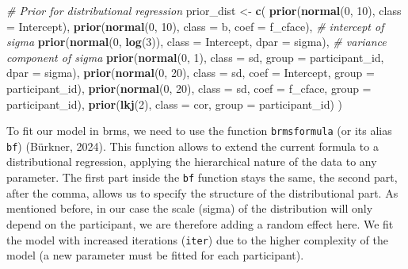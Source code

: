 \documentclass[
  doc,12pt,floatsintext]{apa7}
\newenvironment{Shaded}{\begin{snugshade}}{\end{snugshade}}
\newcommand{\AttributeTok}[1]{\textcolor[rgb]{0.13,0.29,0.53}{#1}}
\newcommand{\CommentTok}[1]{\textcolor[rgb]{0.56,0.35,0.01}{\textit{#1}}}
\newcommand{\DecValTok}[1]{\textcolor[rgb]{0.00,0.00,0.81}{#1}}
\newcommand{\FunctionTok}[1]{\textcolor[rgb]{0.13,0.29,0.53}{\textbf{#1}}}
\newcommand{\NormalTok}[1]{#1}
\newcommand{\OtherTok}[1]{\textcolor[rgb]{0.56,0.35,0.01}{#1}}
\begin{document}
\begin{Shaded}
\begin{Highlighting}[]
\CommentTok{\# Prior for distributional regression}
\NormalTok{prior\_dist }\OtherTok{\textless{}{-}} \FunctionTok{c}\NormalTok{(}
  \FunctionTok{prior}\NormalTok{(}\FunctionTok{normal}\NormalTok{(}\DecValTok{0}\NormalTok{, }\DecValTok{10}\NormalTok{), }\AttributeTok{class =}\NormalTok{ Intercept), }
  \FunctionTok{prior}\NormalTok{(}\FunctionTok{normal}\NormalTok{(}\DecValTok{0}\NormalTok{, }\DecValTok{10}\NormalTok{), }\AttributeTok{class =}\NormalTok{ b, }\AttributeTok{coef =}\NormalTok{ f\_cface),}
  \CommentTok{\# intercept of sigma}
  \FunctionTok{prior}\NormalTok{(}\FunctionTok{normal}\NormalTok{(}\DecValTok{0}\NormalTok{, }\FunctionTok{log}\NormalTok{(}\DecValTok{3}\NormalTok{)), }\AttributeTok{class =}\NormalTok{ Intercept, }\AttributeTok{dpar =}\NormalTok{ sigma), }
  \CommentTok{\# variance component of sigma}
  \FunctionTok{prior}\NormalTok{(}\FunctionTok{normal}\NormalTok{(}\DecValTok{0}\NormalTok{, }\DecValTok{1}\NormalTok{), }\AttributeTok{class =}\NormalTok{ sd, }
        \AttributeTok{group =}\NormalTok{ participant\_id, }\AttributeTok{dpar =}\NormalTok{ sigma), }
  \FunctionTok{prior}\NormalTok{(}\FunctionTok{normal}\NormalTok{(}\DecValTok{0}\NormalTok{, }\DecValTok{20}\NormalTok{), }\AttributeTok{class =}\NormalTok{ sd, }\AttributeTok{coef =}\NormalTok{ Intercept, }
        \AttributeTok{group =}\NormalTok{ participant\_id),  }
  \FunctionTok{prior}\NormalTok{(}\FunctionTok{normal}\NormalTok{(}\DecValTok{0}\NormalTok{, }\DecValTok{20}\NormalTok{), }\AttributeTok{class =}\NormalTok{ sd, }\AttributeTok{coef =}\NormalTok{ f\_cface, }
        \AttributeTok{group =}\NormalTok{ participant\_id), }
  \FunctionTok{prior}\NormalTok{(}\FunctionTok{lkj}\NormalTok{(}\DecValTok{2}\NormalTok{), }\AttributeTok{class =}\NormalTok{ cor, }\AttributeTok{group =}\NormalTok{ participant\_id)}
\NormalTok{  ) }
\end{Highlighting}
\end{Shaded}

To fit our model in brms, we need to use the function \texttt{brmsformula} (or its alias \texttt{bf}) (Bürkner, 2024). This function allows to extend the current formula to a distributional regression, applying the hierarchical nature of the data to any parameter. The first part inside the \texttt{bf} function stays the same, the second part, after the comma, allows us to specify the structure of the distributional part. As mentioned before, in our case the scale (sigma) of the distribution will only depend on the participant, we are therefore adding a random effect here. We fit the model with increased iterations (\texttt{iter}) due to the higher complexity of the model (a new parameter must be fitted for each participant).
\end{document}
